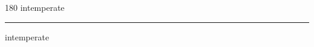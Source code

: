 
\begin{frame}
\begin{center}
\begin{turn}{180}
{\fontsize{2.5cm}{1em}\selectfont intemperate}
\end{turn}
\vspace{1em}\par  
\hrule
\vspace{1em}\par  
{\fontsize{2.5cm}{1em}\selectfont intemperate}
\end{center}
\end{frame}
